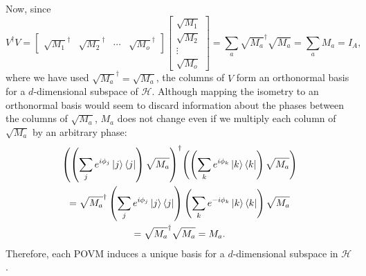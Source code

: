 \documentclass[10pt, a4paper]{article}
\numberwithin{equation}{section} %
\theoremstyle{definition}
\theoremstyle{plain}
\newcommand{\?}{\mathrel{?}} %
\newcommand{\Hs}{\mathcal{H}} %
\begin{document}
                  Now, since
                  \begin{equation}
                    V^{\dagger}V = \begin{bmatrix} \sqrt{M_1}^{\dagger} & \sqrt{M_2}^{\dagger} & \cdots & \sqrt{M_o}^{\dagger} \end{bmatrix} \begin{bmatrix} \sqrt{M_1} \\ \sqrt{M_2} \\ \vdots \\ \sqrt{M_o} \end{bmatrix} = \sum_a \sqrt{M_a}^{\dagger}\sqrt{M_a} = \sum_a M_a = I_A,
                  \end{equation}
                  where we have used \(\sqrt{M_a}^{\dagger} = \sqrt{M_a}\), the columns of \(V\) form an orthonormal basis for a \(d\)-dimensional subspace of \(\Hs\). Although mapping the isometry to an orthonormal basis would seem to discard information about the phases between the columns of \(\sqrt{M_a}\), \(M_a\) does not change even if we multiply each column of \(\sqrt{M_a}\) by an arbitrary phase:
                  \begin{gather}
                    {\left(\left(\sum_j e^{i\phi_j} \ket{j}\bra{j}\right)\sqrt{M_a}\right)}^{\dagger} {\left(\left(\sum_k e^{i\phi_k} \ket{k}\bra{k}\right)\sqrt{M_a}\right)} \\
                    = \sqrt{M_a}^{\dagger}\left(\sum_j e^{i\phi_j} \ket{j}\bra{j}\right) \left(\sum_k e^{-i\phi_k} \ket{k}\bra{k}\right)\sqrt{M_a} \\
                    = \sqrt{M_a}^{\dagger}\sqrt{M_a} = M_a.
                  \end{gather}
                  Therefore, each POVM induces a unique basis for a \(d\)-dimensional subspace in \(\Hs\).
\end{document}
